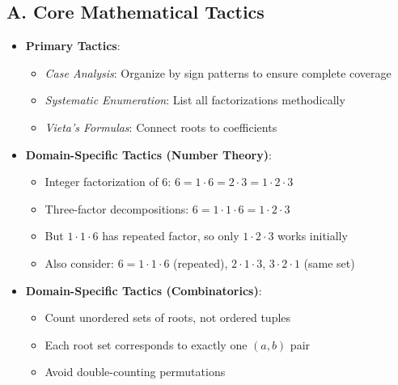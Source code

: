 \documentclass[12pt]{article}
\begin{document}
\begin{tacticalbox}
\subsection*{A. Core Mathematical Tactics}
\begin{itemize}[leftmargin=*]
    \item \textbf{Primary Tactics}: 
    \begin{itemize}
        \item \emph{Case Analysis}: Organize by sign patterns to ensure complete coverage
        \item \emph{Systematic Enumeration}: List all factorizations methodically
        \item \emph{Vieta's Formulas}: Connect roots to coefficients
    \end{itemize}
    \item \textbf{Domain-Specific Tactics (Number Theory)}: 
    \begin{itemize}
        \item Integer factorization of 6: $6 = 1 \cdot 6 = 2 \cdot 3 = 1 \cdot 2 \cdot 3$
        \item Three-factor decompositions: $6 = 1 \cdot 1 \cdot 6 = 1 \cdot 2 \cdot 3$
        \item But $1 \cdot 1 \cdot 6$ has repeated factor, so only $1 \cdot 2 \cdot 3$ works initially
        \item Also consider: $6 = 1 \cdot 1 \cdot 6$ (repeated), $2 \cdot 1 \cdot 3$, $3 \cdot 2 \cdot 1$ (same set)
    \end{itemize}
    \item \textbf{Domain-Specific Tactics (Combinatorics)}: 
    \begin{itemize}
        \item Count unordered sets of roots, not ordered tuples
        \item Each root set corresponds to exactly one $(a,b)$ pair
        \item Avoid double-counting permutations
    \end{itemize}
\end{itemize}
\end{tacticalbox}
\end{document}
